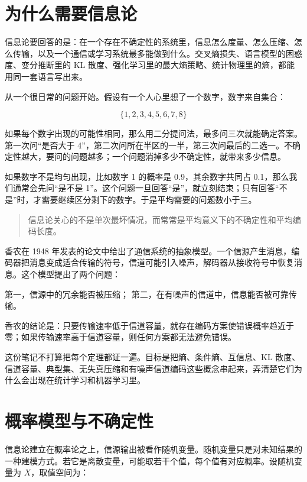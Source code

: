 \section{为什么需要信息论}

信息论要回答的是：在一个存在不确定性的系统里，信息怎么度量、怎么压缩、怎么传输，以及一个通信或学习系统最多能做到什么。交叉熵损失、语言模型的困惑度、变分推断里的 KL 散度、强化学习里的最大熵策略、统计物理里的熵，都能用同一套语言写出来。

从一个很日常的问题开始。假设有一个人心里想了一个数字，数字来自集合：

\[
\{1,2,3,4,5,6,7,8\}
\]

如果每个数字出现的可能性相同，那么用二分提问法，最多问三次就能确定答案。第一次问“是否大于 4”，第二次问所在半区的一半，第三次问最后的二选一。不确定性越大，要问的问题越多；一个问题消掉多少不确定性，就带来多少信息。

如果数字不是均匀出现，比如数字 1 的概率是 0.9，其余数字共同占 0.1，那么我们通常会先问“是不是 1”。这个问题一旦回答“是”，就立刻结束；只有回答“不是”时，才需要继续区分剩下的数字。于是平均需要的问题数小于三。

\begin{quote}
信息论关心的不是单次最坏情况，而常常是平均意义下的不确定性和平均编码长度。
\end{quote}

香农在 1948 年发表的论文中给出了通信系统的抽象模型。一个信源产生消息，编码器把消息变成适合传输的符号，信道可能引入噪声，解码器从接收符号中恢复消息。这个模型提出了两个问题：

第一，信源中的冗余能否被压缩；
第二，在有噪声的信道中，信息能否被可靠传输。

香农的结论是：只要传输速率低于信道容量，就存在编码方案使错误概率趋近于零；如果传输速率高于信道容量，则任何方案都无法避免错误。

这份笔记不打算把每个定理都证一遍。目标是把熵、条件熵、互信息、KL 散度、信道容量、典型集、无失真压缩和有噪声信道编码这些概念串起来，弄清楚它们为什么会出现在统计学习和机器学习里。

\section{概率模型与不确定性}

信息论建立在概率论之上，信源输出被看作随机变量。随机变量只是对未知结果的一种建模方式。若它是离散变量，可能取若干个值，每个值有对应概率。设随机变量为 \(X\)，取值空间为：

